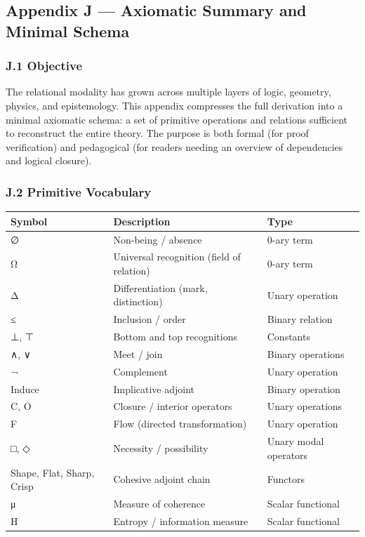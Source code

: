 \documentclass[11pt]{article}
\begin{document}
\subsection*{Appendix J — Axiomatic Summary and Minimal Schema}
\label{sec:orgb8aa884}

\subsubsection*{J.1 Objective}
\label{sec:org9408883}
The relational modality has grown across multiple layers of logic, geometry, physics,  
and epistemology. This appendix compresses the full derivation into a minimal axiomatic schema:  
a set of primitive operations and relations sufficient to reconstruct the entire theory.  
The purpose is both formal (for proof verification) and pedagogical (for readers needing an overview  
of dependencies and logical closure).
\subsubsection*{J.2 Primitive Vocabulary}
\label{sec:org95e2e6a}
\begin{center}
\begin{tabular}{lll}
Symbol & Description & Type\\
\hline
∅ & Non-being / absence & 0-ary term\\
Ω & Universal recognition (field of relation) & 0-ary term\\
Δ & Differentiation (mark, distinction) & Unary operation\\
≤ & Inclusion / order & Binary relation\\
⊥, ⊤ & Bottom and top recognitions & Constants\\
∧, ∨ & Meet / join & Binary operations\\
¬ & Complement & Unary operation\\
Induce & Implicative adjoint & Binary operation\\
C, O & Closure / interior operators & Unary operations\\
F & Flow (directed transformation) & Unary operation\\
□, ◇ & Necessity / possibility & Unary modal operators\\
Shape, Flat, Sharp, Crisp & Cohesive adjoint chain & Functors\\
μ & Measure of coherence & Scalar functional\\
H & Entropy / information measure & Scalar functional\\
\end{tabular}
\end{center}
\end{document}
